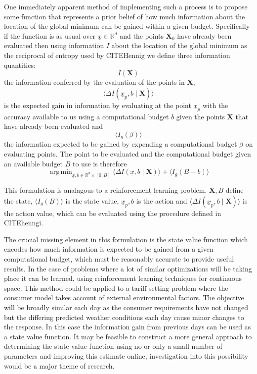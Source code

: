 \documentclass[a4paper, 10 pt, conference]{ieeeconf}  %
\DeclareMathOperator*{\argmin}{arg\,min}
\begin{document}
One immediately apparent method of implementing such a process is to propose some function that represents a prior belief of how much information about the location of the global minimum can be gained within a given budget. Specifically if the function is as usual over $\underline{x} \in \mathbb{R}^{d}$ and the points $\mathbf{X}_{0}$ have already been evaluated then using information $I$ about the location of the global minimum as the reciprocal of entropy used by CITEHennig we define three information quantities:
\begin{equation}
I(\mathbf{X})
\end{equation}
the information conferred by the evaluation of the points in $\mathbf{X}$,
\begin{equation}
\langle\Delta I(\underline{x}_{p},b \mid \mathbf{X})\rangle
\end{equation}
is the expected gain in information by evaluating at the point $\underline{x}_{p}$ with the accuracy available to us using a computational budget $b$ given the points $\mathbf{X}$ that have already been evaluated and
\begin{equation}
\langle I_{g}(\beta)\rangle
\end{equation}
the information expected to be gained by expending a computational budget $\beta$ on evaluating points.
The point to be evaluated and the computational budget given an available budget $B$ to use is therefore
\begin{equation}
\argmin_{\underline{x},b \in \mathbb{R}^{d} \times [0,B]} \langle\Delta I(\underline{x},b \mid \mathbf{X})\rangle + \langle I_{g}(B-b)\rangle
\end{equation}

This formulation is analagous to a reinforcement learning problem. $\mathbf{X},B$ define the state, $\langle I_{g}(B)\rangle$ is the state value, $\underline{x}_{p},b$ is the action and $\langle\Delta I(\underline{x}_{p},b \mid \mathbf{X})\rangle$ is the action value, which can be evaluated using the procedure defined in CITEhenngi.

The crucial missing element in this formulation is the state value function which encodes how much information is expected to be gained from a given computational budget, which must be reasonably accurate to provide useful results. In the case of problems where a lot of similar optimizations will be taking place it can be learned, using reinforcement learning techniques for continuous space. This method could be applied to a tariff setting problem where the consumer model takes account of external environmental factors. The objective will be broadly similar each day as the consumer requirements have not changed but the differing predicted weather conditions each day cause minor changes to the response. In this case the information gain from previous days can be used as a state value function. It may be feasible to construct a more general approach to determining the state value function using no or only a small number of parameters and improving this estimate online, investigation into this possibility would be a major theme of research.
\end{document}
